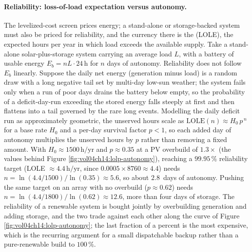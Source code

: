 \paragraph{Reliability: loss-of-load expectation versus autonomy.} The
levelized-cost screen prices energy; a stand-alone or storage-backed
system must also be priced for reliability, and the currency there is the
 (LOLE), the expected hours per year in
which load exceeds the available supply. Take a stand-alone
solar-plus-storage system carrying an average load $L$, with a battery of
usable energy $E_b = n L \cdot 24\,\si{\hour}$ for $n$ days of autonomy.
Reliability does not follow $E_b$ linearly. Suppose the daily net energy
(generation minus load) is a random draw with a long negative tail set by
multi-day low-sun weather; the system fails only when a run of poor days
drains the battery below empty, so the probability of a deficit-day-run
exceeding the stored energy falls steeply at first and then flattens into a
tail governed by the rare long events. Modelling the daily deficit run as
approximately geometric, the unserved hours scale as $\text{LOLE}(n)
\approx H_0\, p^{\,n}$ for a base rate $H_0$ and a per-day survival
factor $p < 1$, so each added day of autonomy multiplies the unserved
hours by $p$ rather than removing a fixed amount. With $H_0 \approx
1500\,\si{\hour}/\text{yr}$ and $p \approx 0.35$ at a PV overbuild of
$1.3\times$ (the values behind Figure
\ref{fig:vol04ch14:lolp-autonomy}), reaching a $99.95\,\%$ reliability
target (LOLE $\approx 4.4\,\si{\hour}/\text{yr}$, since $0.0005\times8760
\approx 4.4$) needs $n = \ln(4.4/1500)/\ln(0.35) \approx 5.6$, so about
$2.8\,$ days of autonomy. Pushing the same target on an array with no
overbuild ($p \approx 0.62$) needs $n = \ln(4.4/1800)/\ln(0.62) \approx
12.6$, more than four days of storage. The reliability of a renewable
system is bought jointly by overbuilding generation and adding storage,
and the two trade against each other along the curve of Figure
\ref{fig:vol04ch14:lolp-autonomy}; the last fraction of a percent is the
most expensive, which is the recurring argument for a small dispatchable
backup rather than a pure-renewable build to $100\,\%$.



